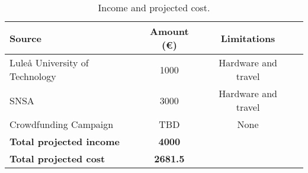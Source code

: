 \begin{table}[H]
\centering
\begin{tabular}{|l|c|c|c|} 
\hline
Source & Amount (\euro) & Limitations   \\ 
\hline
Luleå University of Technology & 1000 & Hardware and travel \\
SNSA & 3000 & Hardware and travel \\
Crowdfunding Campaign & TBD & None \\
\hline
\textbf{Total projected income} & \textbf{4000} & \\
\hline
\bf{Total projected cost} & \bf{2681.5} & \\
\hline
\end{tabular}
\caption{Income and projected cost.}
\label{table:income-and-cost}
\end{table}

\raggedbottom
